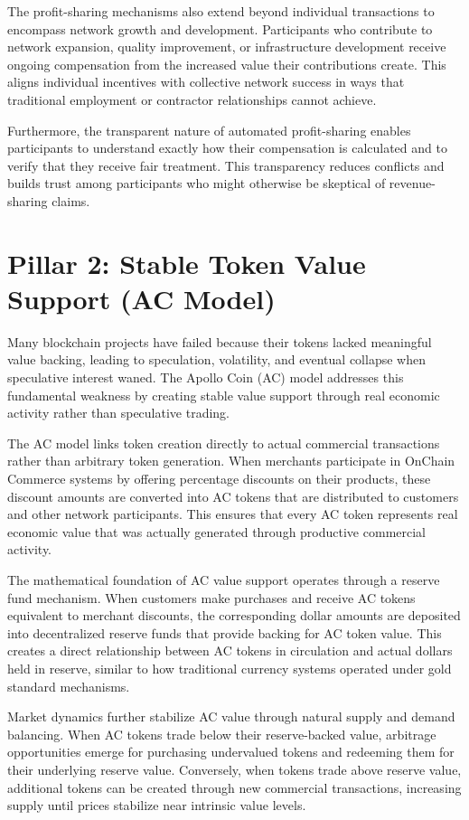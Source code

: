 \documentclass[
  Letterpaper,
]{scrbook}
\begin{document}
The profit-sharing mechanisms also extend beyond individual transactions
to encompass network growth and development. Participants who contribute
to network expansion, quality improvement, or infrastructure development
receive ongoing compensation from the increased value their
contributions create. This aligns individual incentives with collective
network success in ways that traditional employment or contractor
relationships cannot achieve.

Furthermore, the transparent nature of automated profit-sharing enables
participants to understand exactly how their compensation is calculated
and to verify that they receive fair treatment. This transparency
reduces conflicts and builds trust among participants who might
otherwise be skeptical of revenue-sharing claims.

\section{Pillar 2: Stable Token Value Support (AC
Model)}\label{pillar-2-stable-token-value-support-ac-model}

Many blockchain projects have failed because their tokens lacked
meaningful value backing, leading to speculation, volatility, and
eventual collapse when speculative interest waned. The Apollo Coin (AC)
model addresses this fundamental weakness by creating stable value
support through real economic activity rather than speculative trading.

The AC model links token creation directly to actual commercial
transactions rather than arbitrary token generation. When merchants
participate in OnChain Commerce systems by offering percentage discounts
on their products, these discount amounts are converted into AC tokens
that are distributed to customers and other network participants. This
ensures that every AC token represents real economic value that was
actually generated through productive commercial activity.

The mathematical foundation of AC value support operates through a
reserve fund mechanism. When customers make purchases and receive AC
tokens equivalent to merchant discounts, the corresponding dollar
amounts are deposited into decentralized reserve funds that provide
backing for AC token value. This creates a direct relationship between
AC tokens in circulation and actual dollars held in reserve, similar to
how traditional currency systems operated under gold standard
mechanisms.

Market dynamics further stabilize AC value through natural supply and
demand balancing. When AC tokens trade below their reserve-backed value,
arbitrage opportunities emerge for purchasing undervalued tokens and
redeeming them for their underlying reserve value. Conversely, when
tokens trade above reserve value, additional tokens can be created
through new commercial transactions, increasing supply until prices
stabilize near intrinsic value levels.
\end{document}
